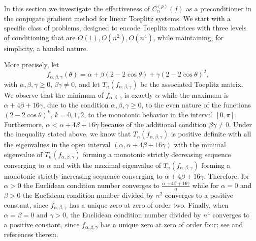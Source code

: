 \documentclass{article}
\begin{document}
In this section we investigate the effectiveness of $ C_{ n }^{ \left( p \right) }(f) $ as a preconditioner in the conjugate gradient method for linear Toeplitz systems. We start with a specific class of problems, designed to encode Toeplitz matrices with three levels of conditioning that are $O(1), O(n^2), O(n^4)$, while maintaining, for simplicity, a banded nature.

More precisely, let
\begin{equation} \label{def_f_1}
	f_{ \alpha, \beta, \gamma } \left( \theta \right) = \alpha + \beta \left( 2 - 2 \cos \theta \right) + \gamma \left( 2 - 2 \cos \theta \right)^{ 2 },
\end{equation}
with $\alpha, \beta, \gamma \ge 0$, $\beta \gamma \neq 0$, and let $ T_{ n } \left( f_{ \alpha, \beta, \gamma } \right) $ be the associated Toeplitz matrix. We observe that the minimum of $f_{ \alpha, \beta, \gamma }$ is exactly $\alpha$ while the maximum is $\alpha + 4\beta + 16\gamma$, due to the condition $\alpha, \beta, \gamma \ge 0$, to the even nature of the functions $\left( 2 - 2 \cos \theta \right)^{k}$, $k=0,1,2$, to the monotonic behavior in the interval $[0,\pi]$. Furthermore,  $\alpha <\alpha + 4\beta + 16\gamma$ because of the additional condition $\beta \gamma \neq 0$.
Under the inequality stated above, we know that  $ T_{ n } \left( f_{ \alpha, \beta, \gamma } \right) $ is positive definite with all the eigenvalues in the open interval $(\alpha,\alpha + 4\beta + 16\gamma)$ with the minimal eigenvalue of $ T_{ n } \left( f_{ \alpha, \beta, \gamma } \right) $ forming a monotonic strictly decreasing sequence converging to $\alpha$ and with the maximal eigenvalue of $ T_{ n } \left( f_{ \alpha, \beta, \gamma } \right) $ forming a monotonic strictly increasing sequence converging to $\alpha+ 4\beta + 16\gamma$.
Therefore, for $\alpha>0$ the Euclidean condition number converges to $\frac{\alpha+ 4\beta + 16\gamma}{\alpha}$ while for $\alpha=0$ and $\beta>0$ the Euclidean condition number divided by $n^2$ converges to a positive constant, since $f_{ \alpha, \beta, \gamma }$ has a unique zero at zero of order two. Finally, when $\alpha=\beta=0$ and $\gamma>0$, the Euclidean condition number divided by $n^4$ converges to a positive constant, since $f_{ \alpha, \beta, \gamma }$ has a unique zero at zero of order four; see \cite{extreme1,extreme2,GLT-bookI} and references therein.
\end{document}

